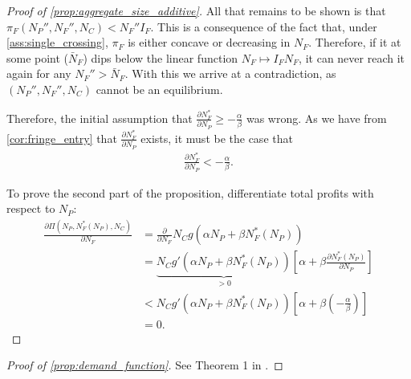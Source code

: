 \documentclass[a4paper]{article}
\begin{document}
\begin{proof}[Proof of \cref{prop:aggregate_size_additive}]
    All that remains to be shown is that $\pi_F(N_P'', N_F'', N_C) < N_F'' I_F$.
    This is a consequence of the fact that, under \cref{ass:single_crossing}, $\pi_F$ is either concave or decreasing in $N_F$.
    Therefore, if it at some point ($\bar{N}_F$) dips below the linear function $N_F \mapsto I_F N_F$, it can never reach it again for any $N_F'' > \bar{N}_F$.
    With this we arrive at a contradiction, as $(N_P'', N_F'', N_C)$ cannot be an equilibrium.

    Therefore, the initial assumption that $\frac{\partial N_F^*}{\partial N_P} \geq -\frac{\alpha}{\beta}$ was wrong.
    As we have from \cref{cor:fringe_entry} that $\frac{\partial N_F^*}{\partial N_P}$ exists, it must be the case that
    \begin{align*}
        \frac{\partial N_F^*}{\partial N_P} < -\frac{\alpha}{\beta}.
    \end{align*}

    To prove the second part of the proposition, differentiate total profits with respect to $N_P$:
    \begin{align*}
        \frac{\partial \Pi(N_P, N_F^*(N_P), N_C)}{\partial N_F} &= \frac{\partial}{\partial N_F} N_C g(\alpha N_P + \beta N_F^*(N_P)) \\
        &= \underbrace{N_C g'(\alpha N_P + \beta N_F^*(N_P))}_{> 0} \left[ \alpha + \beta \frac{\partial N_F^*(N_P)}{\partial N_P} \right] \\
        &< N_C g'(\alpha N_P + \beta N_F^*(N_P)) \left[ \alpha + \beta \left( -\frac{\alpha}{\beta} \right) \right] \\
        &= 0.
    \end{align*}
\end{proof}

\begin{proof}[Proof of \cref{prop:demand_function}]
    See Theorem 1 in \textcite{anderson2021hybrid}.
\end{proof}
\end{document}
